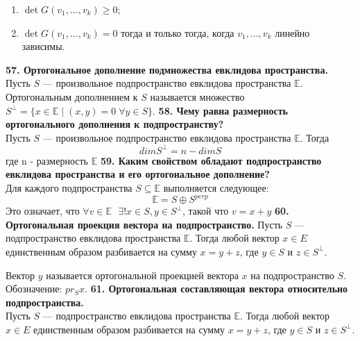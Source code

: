 \documentclass{article}
\begin{document}
\begin{enumerate}
	\item $\det G(v_1, \ldots, v_k) \geqslant 0$;
	\item $\det G(v_1, \ldots, v_k) = 0$ тогда и только тогда, когда $v_1, \ldots, v_k$ линейно зависимы.
\end{enumerate}
\textbf{57. Ортогональное дополнение подмножества евклидова пространства.}\\
Пусть $S$ --- произвольное подпространство евклидова пространства $\mathbb{E}$. Ортогональным дополнением к $S$ называется множество $S^{\perp} = \{x\in \mathbb{E}\; |\; (x,y) = 0\;\forall y \in S\}$.
\newline
\newline
\textbf{58. Чему равна размерность ортогонального дополнения к подпространству?}\\
Пусть $S$ --- произвольное подпространство евклидова пространства $\mathbb{E}$. Тогда
$$dimS^{\perp}=n-dimS$$
где n - размерность $\mathbb{E}$
\newline
\newline
\textbf{59. Каким свойством обладают подпространство евклидова пространства и его ортогональное дополнение?}\\
Для каждого подпространства $S \subseteq\mathbb{E}$ выполняется следующее:
$$\mathbb{E}=S\oplus S^{perp}$$
Это означает, что $\forall v \in \mathbb{E}~~~\exists!x\in S, y \in S^{\perp}$, такой что $v = x+y$
\newline
\newline
\textbf{60. Ортогональная проекция вектора на подпространство.}
Пусть $S$ --- подпространство евклидова пространства $\mathbb{E}$. Тогда любой вектор $x \in E$ единственным образом разбивается на сумму $x = y + z$, где $y \in S$ и $z \in S^\perp$. 

Вектор $y$ называется ортогональной проекцией вектора $x$ на подпространство $S$. Обозначение: $pr_S x$. 
\newline
\newline
\textbf{61. Ортогональная составляющая вектора относительно подпространства.}\\
Пусть $S$ --- подпространство евклидова пространства $\mathbb{E}$. Тогда любой вектор $x \in E$ единственным образом разбивается на сумму $x = y + z$, где $y \in S$ и $z \in S^\perp$. 
\end{document}
